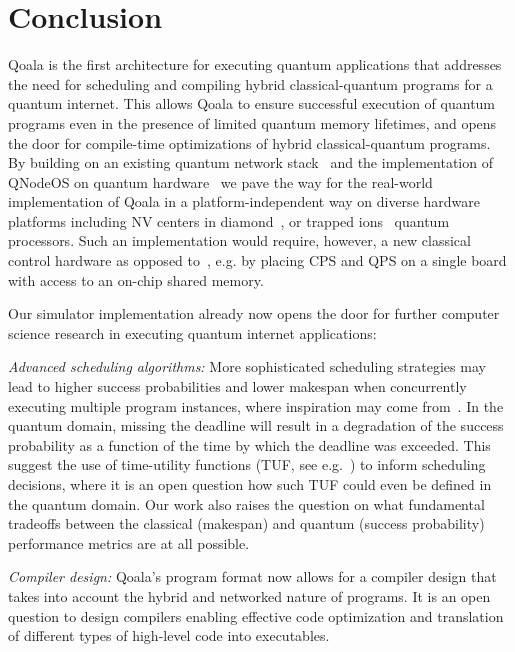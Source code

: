 \section{Conclusion}
\label{sec:conclusion}
Qoala is the first architecture for executing quantum applications that addresses the need for scheduling and compiling hybrid classical\hyp{}quantum programs for a quantum internet.
This allows Qoala to ensure successful execution of quantum programs even in the presence of limited quantum memory lifetimes, and opens the door for compile-time optimizations of hybrid classical-quantum programs.
By building on an existing quantum network stack~\cite{dahlberg2019link, pompili2022experimental} and the implementation of QNodeOS on quantum hardware~\cite{pompili2022experimental, donne2024design} we pave the way for the real-world implementation of Qoala in a platform-independent way on diverse hardware platforms including NV centers in diamond~\cite{pompili2021realization, pompili2022experimental}, or trapped ions~\cite{krutyanskiy2023entanglement,krutyanskiy2023telecom} quantum processors. 
Such an implementation would require, however, a new classical control hardware as opposed to~\cite{pompili2022experimental, donne2024design}, e.g. by placing CPS and QPS on a single board with access to an on-chip shared memory. 

Our simulator implementation already now opens the door for further computer science research in executing quantum internet applications:

\textit{Advanced scheduling algorithms:}
More sophisticated scheduling strategies may lead to higher success probabilities and lower makespan when concurrently executing multiple program instances, where inspiration may come from~\cite{topcuoglu2002performance, baruah2011scheduling, andersson2006multiprocessor, polychronopoulos1991hierarchical}. 
In the quantum domain, missing the deadline will result in a degradation of the success probability as a function of the time by which the deadline was exceeded.
This suggest the use of time-utility functions (TUF, see e.g.~\cite{jensen1993timeliness, li2004utility}) to inform scheduling decisions, where it is an open question how such TUF could even be defined in the quantum domain.
Our work also raises the question on what fundamental tradeoffs between the classical (makespan) and quantum (success probability) performance metrics are at all possible.

\textit{Compiler design:}
Qoala's program format now allows for a compiler design that takes into account the hybrid and networked nature of programs.
It is an open question to design compilers enabling effective code optimization and translation of different types of high-level code into executables.

